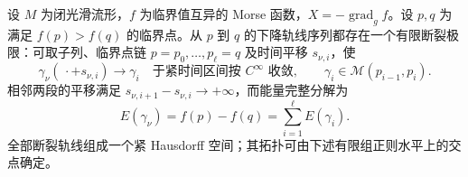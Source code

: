\begin{theorem}\label{g2:thm:broken-trajectory-compactness}
	设 \(M\) 为闭光滑流形，\(f\) 为临界值互异的 Morse 函数，\(X=-\operatorname{grad}_g f\)。设 \(p,q\) 为满足 \(f(p)>f(q)\) 的临界点。从 \(p\) 到 \(q\) 的下降轨线序列都存在一个有限断裂极限：可取子列、临界点链 \(p=p_0,\ldots,p_\ell=q\) 及时间平移 \(s_{\nu,i}\)，使
	\[
		\gamma_\nu(\,\cdot+s_{\nu,i})\longrightarrow\gamma_i
		\quad\text{于紧时间区间按 }C^\infty\text{ 收敛},
		\qquad
		\gamma_i\in\mathcal M(p_{i-1},p_i).
	\]
	相邻两段的平移满足 \(s_{\nu,i+1}-s_{\nu,i}\to+\infty\)，而能量完整分解为
	\begin{equation}\label{g2:eq:broken-energy-sum}
		E(\gamma_\nu)=f(p)-f(q)=\sum_{i=1}^{\ell}E(\gamma_i).
	\end{equation}
	全部断裂轨线组成一个紧 Hausdorff 空间；其拓扑可由下述有限组正则水平上的交点确定。
\end{theorem}
